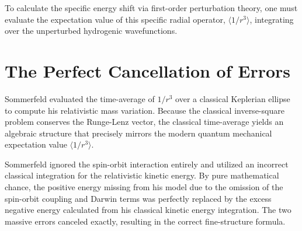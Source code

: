 \documentclass[12pt]{article}
\begin{document}
To calculate the specific energy shift via first-order perturbation theory, one must evaluate the expectation value of this specific radial operator, $\langle 1/r^3 \rangle$, integrating over the unperturbed hydrogenic wavefunctions.

\section{The Perfect Cancellation of Errors}
Sommerfeld evaluated the time-average of $1/r^3$ over a classical Keplerian ellipse to compute his relativistic mass variation. Because the classical inverse-square problem conserves the Runge-Lenz vector, the classical time-average yields an algebraic structure that precisely mirrors the modern quantum mechanical expectation value $\langle 1/r^3 \rangle$. 

Sommerfeld ignored the spin-orbit interaction entirely and utilized an incorrect classical integration for the relativistic kinetic energy. By pure mathematical chance, the positive energy missing from his model due to the omission of the spin-orbit coupling and Darwin terms was perfectly replaced by the excess negative energy calculated from his classical kinetic energy integration. The two massive errors canceled exactly, resulting in the correct fine-structure formula.
\end{document}

